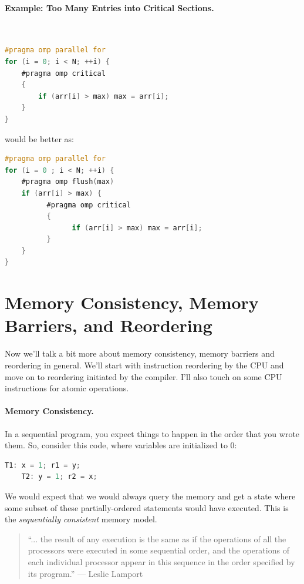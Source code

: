 \documentclass[a4paper]{report}
\begin{document}
\paragraph{Example: Too Many Entries into Critical Sections.}~

  \begin{lstlisting}[language=C]
#pragma omp parallel for
for (i = 0; i < N; ++i) { 
    #pragma omp critical
    {
        if (arr[i] > max) max = arr[i];
    } 
}
  \end{lstlisting}

would be better as:

  \begin{lstlisting}[language=C]
#pragma omp parallel for
for (i = 0 ; i < N; ++i) { 
    #pragma omp flush(max)
    if (arr[i] > max) {
          #pragma omp critical
          {
                if (arr[i] > max) max = arr[i];
          }
    }
}
\end{lstlisting}



\section*{Memory Consistency, Memory Barriers, and Reordering}
Now we'll talk a bit more about memory consistency, memory barriers
and reordering in general. We'll start with instruction reordering by
the CPU and move on to reordering initiated by the compiler.  I'll
also touch on some CPU instructions for atomic operations.

\paragraph{Memory Consistency.} In a sequential program, you expect
things to happen in the order that you wrote them. So, consider this code,
where variables are initialized to 0:

\begin{center}
\begin{lstlisting}[language=C]
    T1: x = 1; r1 = y;
    T2: y = 1; r2 = x;
\end{lstlisting}
\end{center}
We would expect that we would always query the memory and get a state
where some subset of these partially-ordered statements would have executed.
This is the \emph{sequentially consistent} memory model.

\begin{quote}
``... the result of any execution is the same as if the operations of all the processors were executed in some sequential order, and the operations of each individual processor appear in this sequence in the order specified by its program.'' --- Leslie Lamport
\end{quote}
\end{document}
